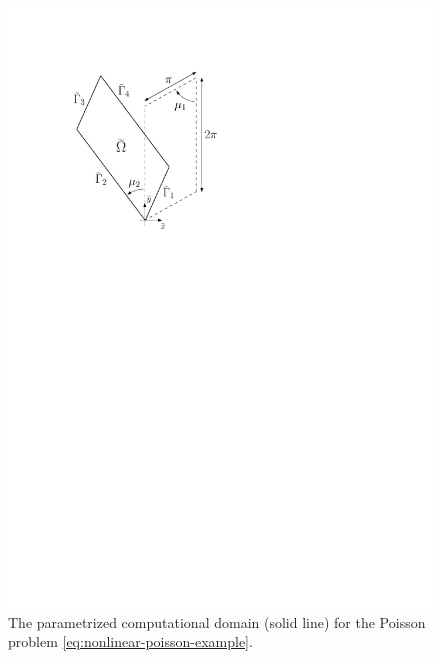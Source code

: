 \documentclass[12pt, a4paper, twoside, openright]{report}
\numberwithin{equation}{chapter}
\theoremstyle{theorem}
\theoremstyle{definition}
\theoremstyle{remark}
\theoremstyle{proposition}
\numberwithin{figure}{chapter}
\begin{document}
		\begin{figure}[t]
			\center
			\includegraphics[scale = 0.55]{domain_square}
			
			\caption{The parametrized computational domain (solid line) for the Poisson problem \eqref{eq:nonlinear-poisson-example}.}
			\label{fig:nonlinear-poisson-example-domain}
		\end{figure}
		
\end{document}
